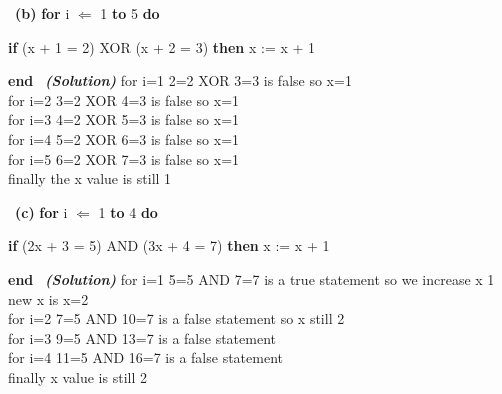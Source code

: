 \documentclass[a4 paper]{article}
\numberwithin{equation}{section}
\newcommand{\subproblem}[1]{~\newline\textbf{(#1)}}
\newcommand{\solution}{~\newline\textbf{\textit{(Solution)}} }
\newcommand{\0}{\mathbf{0}}
\begin{document}
\subproblem{b}  \textbf{for} i $\Leftarrow$ 1 \textbf{to} 5 \textbf{do}\\ 
\par \hspace{5mm} \textbf{if} (x + 1 = 2) XOR (x + 2 = 3) \textbf{then} x := x + 1
\newline
\par \hspace{0.5mm} \textbf{end}
\newline
\solution
\newline
for i=1 2=2 XOR 3=3 is false so x=1\\
for i=2 3=2 XOR 4=3 is false so x=1\\
for i=3 4=2 XOR 5=3 is false so x=1\\
for i=4 5=2 XOR 6=3 is false so x=1\\
for i=5 6=2 XOR 7=3 is false so x=1\\
finally the x value is still 1\\
\newline

\subproblem{c}  \textbf{for} i $\Leftarrow$ 1 \textbf{to} 4 \textbf{do} \newline
\par \hspace{5mm} \textbf{if} (2x + 3 = 5) AND (3x + 4 = 7) \textbf{then} x := x + 1
\newline
\par \hspace{0.5mm} \textbf{end}
\newline 
\solution
\newline
for i=1 5=5 AND 7=7 is a true statement so we increase x 1 new x is x=2\\
for i=2 7=5 AND 10=7 is a false statement so x still 2\\
for i=3 9=5 AND 13=7 is a false statement\\
for i=4 11=5 AND 16=7 is a false statement\\
finally x value is still 2\\
\newline
\end{document}
